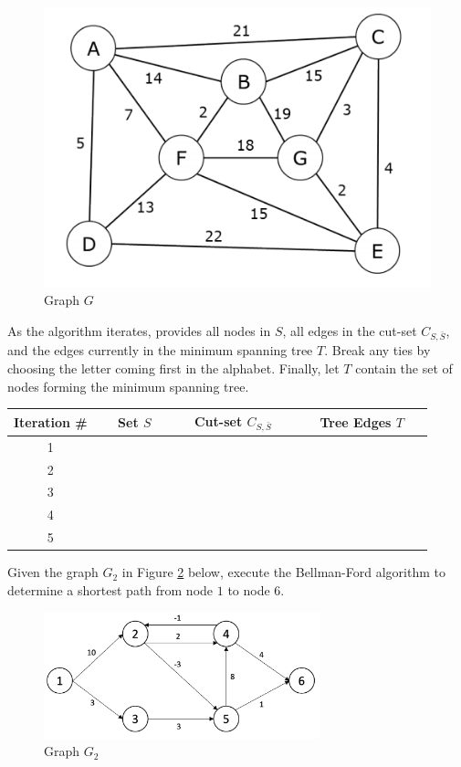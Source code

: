 \documentclass[12pt]{exam}
\begin{document}
\begin{questions}
	\begin{figure}[h] 
	\label{primsfigure}
	\center
	\includegraphics{prims_picture}
	\caption{Graph $G$}
	\end{figure}

As the algorithm iterates, provides all nodes in $S$, all edges in the cut-set $C_{S, \bar{S}}$, and the edges currently in the minimum spanning tree $T$. Break any ties by choosing the letter coming first in the alphabet. Finally, let $T$ contain the set of nodes forming the minimum spanning tree.
\begin{center}
\begin{tabular}{|c|c|c|c|}
\hline
Iteration \# & $\quad$ Set $S \quad$    & $\quad$ Cut-set $C_{S,\bar{S}}$ $\quad$	&$\quad$	Tree Edges $T$ $\quad$ \\ \hline
1 & &  &  \\ \hline
2 & & & \\ \hline
3 & & & \\ \hline
4 & & & \\ \hline
5 & & & \\ \hline
\end{tabular}
\end{center}
	
\question Given the graph $G_2$ in Figure \ref{bellmanfordfig} below, execute the Bellman-Ford algorithm to determine a shortest path from node $1$ to node $6$. 

\begin{figure}[h]
	\label{bellmanfordfig}
	\center
	\includegraphics[width=8cm]{BellmanFordFigure}
	\caption{Graph $G_2$}
	\end{figure}
\begin{parts}

\end{parts}
\end{questions}
\end{document}
